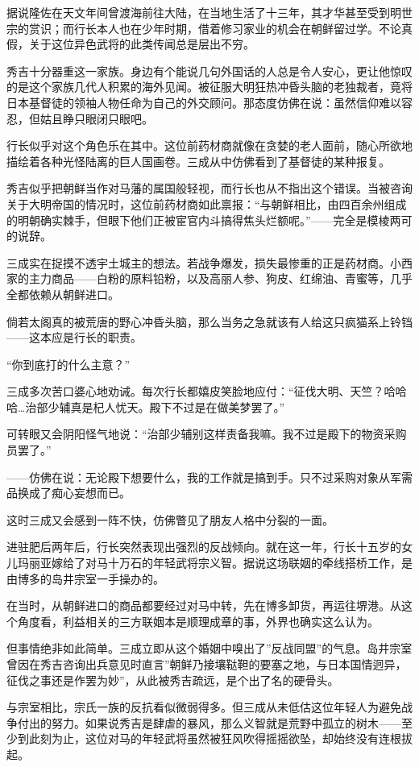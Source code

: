 \documentclass[
]{book}
\begin{document}
据说隆佐在天文年间曾渡海前往大陆，在当地生活了十三年，其才华甚至受到明世宗的赏识；而行长本人也在少年时期，借着修习家业的机会在朝鲜留过学。不论真假，关于这位异色武将的此类传闻总是层出不穷。

秀吉十分器重这一家族。身边有个能说几句外国话的人总是令人安心，更让他惊叹的是这个家族几代人积累的海外见闻。被征服大明狂热冲昏头脑的老独裁者，竟将日本基督徒的领袖人物任命为自己的外交顾问。那态度仿佛在说：虽然信仰难以容忍，但姑且睁只眼闭只眼吧。

行长似乎对这个角色乐在其中。这位前药材商就像在贪婪的老人面前，随心所欲地描绘着各种光怪陆离的巨人国画卷。三成从中仿佛看到了基督徒的某种报复。

秀吉似乎把朝鲜当作对马藩的属国般轻视，而行长也从不指出这个错误。当被咨询关于大明帝国的情况时，这位前药材商如此禀报：``与朝鲜相比，由四百余州组成的明朝确实棘手，但眼下他们正被宦官内斗搞得焦头烂额呢。''------完全是模棱两可的说辞。

三成实在捉摸不透宇土城主的想法。若战争爆发，损失最惨重的正是药材商。小西家的主力商品------白粉的原料铅粉，以及高丽人参、狗皮、红绵油、青蜜等，几乎全都依赖从朝鲜进口。

倘若太阁真的被荒唐的野心冲昏头脑，那么当务之急就该有人给这只疯猫系上铃铛------这本应是行长的职责。

``你到底打的什么主意？''

三成多次苦口婆心地劝诫。每次行长都嬉皮笑脸地应付：``征伐大明、天竺？哈哈哈\ldots 治部少辅真是杞人忧天。殿下不过是在做美梦罢了。''

可转眼又会阴阳怪气地说：``治部少辅别这样责备我嘛。我不过是殿下的物资采购员罢了。''

------仿佛在说：无论殿下想要什么，我的工作就是搞到手。只不过采购对象从军需品换成了痴心妄想而已。

这时三成又会感到一阵不快，仿佛瞥见了朋友人格中分裂的一面。

进驻肥后两年后，行长突然表现出强烈的反战倾向。就在这一年，行长十五岁的女儿玛丽亚嫁给了对马十万石的年轻武将宗义智。据说这场联姻的牵线搭桥工作，是由博多的岛井宗室一手操办的。

在当时，从朝鲜进口的商品都要经过对马中转，先在博多卸货，再运往堺港。从这个角度看，利益相关的三方联姻本是顺理成章的事，外界也确实这么认为。

但事情绝非如此简单。三成立即从这个婚姻中嗅出了''反战同盟''的气息。岛井宗室曾因在秀吉咨询出兵意见时直言''朝鲜乃接壤鞑靼的要塞之地，与日本国情迥异，征伐之事还是作罢为妙''，从此被秀吉疏远，是个出了名的硬骨头。

与宗室相比，宗氏一族的反抗看似微弱得多。但三成从未低估这位年轻人为避免战争付出的努力。如果说秀吉是肆虐的暴风，那么义智就是荒野中孤立的树木------至少到此刻为止，这位对马的年轻武将虽然被狂风吹得摇摇欲坠，却始终没有连根拔起。
\end{document}
